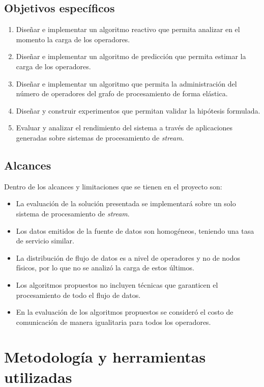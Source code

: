 \subsection{Objetivos específicos}
\begin{enumerate}
	\item Dise\~nar e implementar un algoritmo reactivo que permita analizar en el momento la carga de los operadores.
	\item Dise\~nar e implementar un algoritmo de predicci\'on que permita estimar la carga de los operadores.
	\item Dise\~nar e implementar un algoritmo que permita la administraci\'on del número de operadores del grafo de procesamiento de forma el\'astica.
	\item Dise\~nar y construir experimentos que permitan validar la hip\'otesis formulada.
	\item Evaluar y analizar el rendimiento del sistema a trav\'es de aplicaciones generadas sobre sistemas de procesamiento de \textit{stream}.
\end{enumerate}

\subsection{Alcances}
Dentro de los alcances y limitaciones que se tienen en el proyecto son:
\begin{itemize}
	\item La evaluación de la solución presentada se implementará sobre un solo sistema de procesamiento de \textit{stream}.
	\item Los datos emitidos de la fuente de datos son homogéneos, teniendo una tasa de servicio similar.
	\item La distribución de flujo de datos es a nivel de operadores y no de nodos f\'isicos, por lo que no se analizó la carga de estos \'ultimos.
	\item Los algoritmos propuestos no incluyen t\'ecnicas que garanticen el procesamiento de todo el flujo de datos.
	\item En la evaluación de los algoritmos propuestos se consideró el costo de comunicación de manera igualitaria para todos los operadores.
\end{itemize}


\section{Metodología y herramientas utilizadas}
\label{intro:metodologia}

